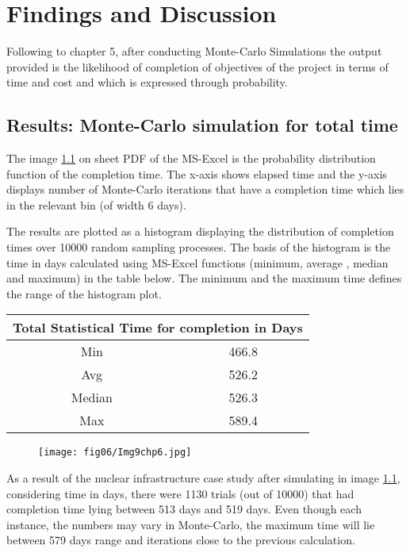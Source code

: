 \let\textcircled=\pgftextcircled
\chapter{Findings and Discussion}
\label{chapFD}

Following to chapter 5, after conducting Monte-Carlo Simulations the output provided is the likelihood of completion of objectives of the project in terms of time and cost and which is expressed through probability.

\section{Results: Monte-Carlo simulation for total time} 


The image \ref{img9ch6} on sheet PDF of the MS-Excel is the probability distribution function of the completion time. The x-axis shows elapsed time and the y-axis displays number of Monte-Carlo iterations that have a completion time which lies in the relevant bin (of width 6 days).

The results are plotted as a histogram displaying the distribution of completion times over 10000 random sampling processes. 
The basis of the histogram is the time in days calculated using MS-Excel functions (minimum, average , median and maximum) in the table below. The minimum and the maximum time defines the range of the histogram plot.

\begin{center}
	\begin{tabular}{ |c|c|} 
		\hline
		\multicolumn{2}{|c|}{Total Statistical Time for completion in Days} \\
		\hline
		Min & 466.8  \\
		\hline
		Avg& 526.2 \\ 
		\hline
		Median &526.3 \\ 
		\hline
		Max& 589.4\\ 
		\hline
	\end{tabular}
\end{center}

\begin{figure}
	\centering
	\texttt{[image: fig06/Img9chp6.jpg]}
	\label{img9ch6}
\end{figure}

 As a result of the nuclear infrastructure case study after simulating in image \ref{img9ch6}, considering time in days, there were 1130 trials (out of 10000) that had completion time lying between 513 days and 519 days. Even though each instance, the numbers may vary in Monte-Carlo, the maximum time will lie between 579 days range and iterations close to the previous calculation.
 

